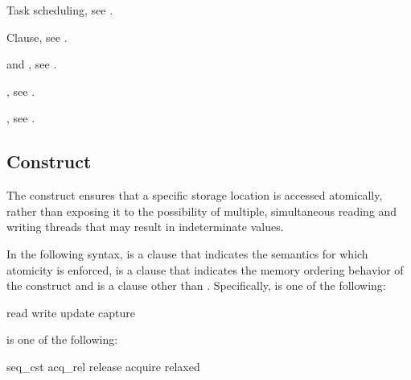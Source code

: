 \begin{crossrefs}
\item Task scheduling, see
.

\item {} Clause, see .

\item {} and , see
.

\item {}, see
.

\item {}, see
.
\end{crossrefs}



\subsection{ Construct}
\label{subsec:atomic Construct}
\summary
The  construct ensures that a specific storage location is accessed 
atomically, rather than exposing it to the possibility of multiple, simultaneous 
reading and writing threads that may result in indeterminate values.

\syntax
In the following syntax,  is a clause that indicates
the semantics for which atomicity is enforced,  is
a clause that indicates the memory ordering behavior of the construct and
 is a clause other than .
Specifically,  is one of the following:

\begin{indentedcodelist}
read
write
update
capture
\end{indentedcodelist}

 is one of the following:

\begin{indentedcodelist}
seq_cst
acq_rel
release
acquire
relaxed
\end{indentedcodelist}

